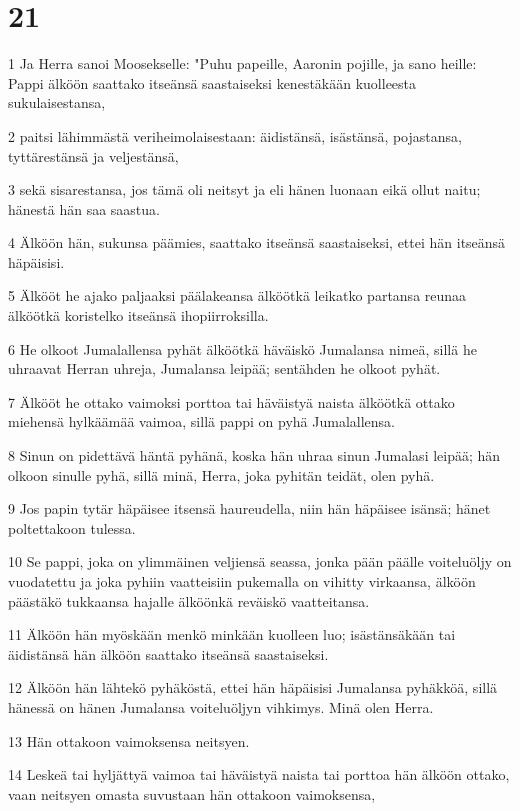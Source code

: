 \chapter{21}

\par 1 Ja Herra sanoi Moosekselle: "Puhu papeille, Aaronin pojille, ja sano heille: Pappi älköön saattako itseänsä saastaiseksi kenestäkään kuolleesta sukulaisestansa,
\par 2 paitsi lähimmästä veriheimolaisestaan: äidistänsä, isästänsä, pojastansa, tyttärestänsä ja veljestänsä,
\par 3 sekä sisarestansa, jos tämä oli neitsyt ja eli hänen luonaan eikä ollut naitu; hänestä hän saa saastua.
\par 4 Älköön hän, sukunsa päämies, saattako itseänsä saastaiseksi, ettei hän itseänsä häpäisisi.
\par 5 Älkööt he ajako paljaaksi päälakeansa älköötkä leikatko partansa reunaa älköötkä koristelko itseänsä ihopiirroksilla.
\par 6 He olkoot Jumalallensa pyhät älköötkä häväiskö Jumalansa nimeä, sillä he uhraavat Herran uhreja, Jumalansa leipää; sentähden he olkoot pyhät.
\par 7 Älkööt he ottako vaimoksi porttoa tai häväistyä naista älköötkä ottako miehensä hylkäämää vaimoa, sillä pappi on pyhä Jumalallensa.
\par 8 Sinun on pidettävä häntä pyhänä, koska hän uhraa sinun Jumalasi leipää; hän olkoon sinulle pyhä, sillä minä, Herra, joka pyhitän teidät, olen pyhä.
\par 9 Jos papin tytär häpäisee itsensä haureudella, niin hän häpäisee isänsä; hänet poltettakoon tulessa.
\par 10 Se pappi, joka on ylimmäinen veljiensä seassa, jonka pään päälle voiteluöljy on vuodatettu ja joka pyhiin vaatteisiin pukemalla on vihitty virkaansa, älköön päästäkö tukkaansa hajalle älköönkä reväiskö vaatteitansa.
\par 11 Älköön hän myöskään menkö minkään kuolleen luo; isästänsäkään tai äidistänsä hän älköön saattako itseänsä saastaiseksi.
\par 12 Älköön hän lähtekö pyhäköstä, ettei hän häpäisisi Jumalansa pyhäkköä, sillä hänessä on hänen Jumalansa voiteluöljyn vihkimys. Minä olen Herra.
\par 13 Hän ottakoon vaimoksensa neitsyen.
\par 14 Leskeä tai hyljättyä vaimoa tai häväistyä naista tai porttoa hän älköön ottako, vaan neitsyen omasta suvustaan hän ottakoon vaimoksensa,
